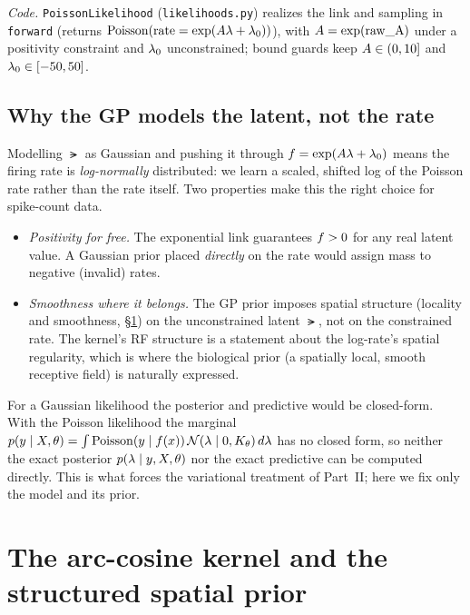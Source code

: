 \emph{Code.} \texttt{PoissonLikelihood} (\texttt{likelihoods.py}) realizes the link
and sampling in \texttt{forward} (returns
$\mathrm{Poisson}(\text{rate}=\exp(A\lambda+\lambda_{0}))$), with $A=\exp(\text{raw\_A})$ under a
positivity constraint and $\lambda_{0}$ unconstrained; bound guards keep
$A\in(0,10]$ and $\lambda_{0}\in[-50,50]$.

\subsection{Why the GP models the latent, not the rate}

Modelling $\lat$ as Gaussian and pushing it through $f=\exp(A\lambda+\lambda_{0})$
means the firing rate is \emph{log-normally} distributed: we learn a scaled,
shifted log of the Poisson rate rather than the rate itself. Two properties make
this the right choice for spike-count data.

\begin{itemize}[leftmargin=1.4em]
\item \emph{Positivity for free.} The exponential link guarantees $f>0$ for any
  real latent value. A Gaussian prior placed \emph{directly} on the rate would
  assign mass to negative (invalid) rates.
\item \emph{Smoothness where it belongs.} The GP prior imposes spatial structure
  (locality and smoothness, \S\ref{sec:kernel}) on the unconstrained latent
  $\lat$, not on the constrained rate. The kernel's RF structure is a statement
  about the log-rate's spatial regularity, which is where the biological prior
  (a spatially local, smooth receptive field) is naturally expressed.
\end{itemize}

\begin{remark}
For a Gaussian likelihood the posterior and predictive would be closed-form. With
the Poisson likelihood the marginal
$p(y\mid X,\theta)=\int \mathrm{Poisson}(y\mid f(x))\,\mathcal{N}(\lambda\mid0,K_\theta)\,d\lambda$
has no closed form, so neither the exact posterior $p(\lambda\mid y,X,\theta)$ nor
the exact predictive can be computed directly. This is what forces the variational
treatment of Part~II; here we fix only the model and its prior.
\end{remark}


\section{The arc-cosine kernel and the structured spatial prior}
\label{sec:kernel}

